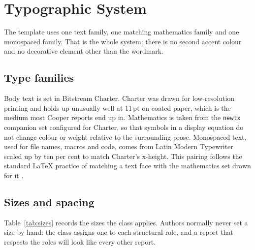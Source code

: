 \section{Typographic System}
\label{sec:typography}

The template uses one text family, one matching mathematics family and one monospaced family.
That is the whole system; there is no second accent colour and no decorative element other
than the wordmark.

\subsection{Type families}

Body text is set in Bitstream Charter. Charter was drawn for low-resolution printing and holds
up unusually well at 11\,pt on coated paper, which is the medium most Cooper reports end up in.
Mathematics is taken from the \texttt{newtx} companion set configured for Charter, so that
symbols in a display equation do not change colour or weight relative to the surrounding
prose. Monospaced text, used for file names, macros and code, comes from Latin Modern
Typewriter scaled up by ten per cent to match Charter's x-height. This pairing follows the
standard \LaTeX{} practice of matching a text face with the mathematics set drawn for it
\citep{mittelbach2023}.

\subsection{Sizes and spacing}

Table~\ref{tab:sizes} records the sizes the class applies. Authors normally never set a size by
hand: the class assigns one to each structural role, and a report that respects the roles will
look like every other report.

